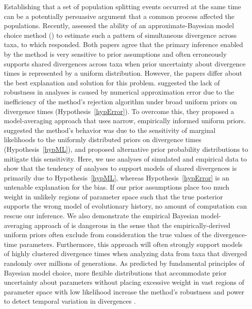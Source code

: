Establishing that a set of population splitting events occurred at the same
time can be a potentially persuasive argument that a common process affected
the populations.
Recently, \citet{Oaks2012} assessed the ability of an approximate-Bayesian
model choice method (\msb) to estimate such a pattern of simultaneous
divergence across taxa, to which \citet{Hickerson2013} responded.
Both papers agree that the primary inference enabled by the method is very
sensitive to prior assumptions and often erroneously supports shared
divergences across taxa when prior uncertainty about divergence times
is represented by a uniform distribution.
However, the papers differ about the best explanation and solution for this
problem.
\citet{Hickerson2013} suggested the lack of robustness in \msb analyses is
caused by numerical approximation error due to the inefficiency of the method's
rejection algorithm under broad uniform priors on divergence times
(Hypothesis~\ref{hypError}).
To overcome this, they proposed a model-averaging approach that uses narrow,
empirically informed uniform priors.
\citet{Oaks2012} suggested the method's behavior was due to the sensitivity of
marginal likelihoods to the uniformly distributed priors on divergence times
(Hypothesis~\ref{hypML}), and proposed alternative prior probability
distributions to mitigate this sensitivity.
Here, we use analyses of simulated and empirical data to show that the tendency
of \msb analyses to support models of shared divergences is primarily due to
Hypothesis~\ref{hypML}, whereas Hypothesis~\ref{hypError} is an untenable
explanation for the bias.
If our prior assumptions place too much weight in unlikely regions of parameter
space such that the true posterior supports the wrong model of evolutionary
history, no amount of computation can rescue our inference. 
We also demonstrate the empirical Bayesian model-averaging approach of
\citet{Hickerson2013} is dangerous in the sense that the empirically-derived
uniform priors often exclude from consideration the true values of the
divergence-time parameters.
Furthermore, this approach will often strongly support models of highly
clustered divergence times when analyzing data from taxa that diverged randomly
over millions of generations.
As predicted by fundamental principles of Bayesian model choice, more flexible
distributions that accommodate prior uncertainty about parameters without
placing excessive weight in vast regions of parameter space with low
likelihood increase the method's robustness and power to detect temporal
variation in divergences \citep{Oaks2014dpp}.
